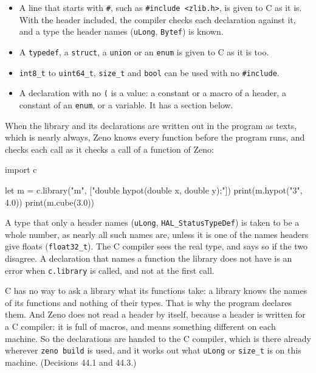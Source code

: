\begin{itemize}
\item A line that starts with \verb|#|, such as
  \verb|#include <zlib.h>|, is given to C as it is. With the header
  included, the compiler checks each declaration against it, and a
  type the header names (\verb|uLong|, \verb|Bytef|) is known.
\item A \verb|typedef|, a \verb|struct|, a \verb|union| or an
  \verb|enum| is given to C as it is too.
\item \verb|int8_t| to \verb|uint64_t|, \verb|size_t| and \verb|bool|
  can be used with no \verb|#include|.
\item A declaration with no \verb|(| is a value: a constant or a macro
  of a header, a constant of an \verb|enum|, or a variable. It has a
  section below.
\end{itemize}

When the library and its declarations are written out in the program
as texts, which is nearly always, Zeno knows every function before the
program runs, and checks each call as it checks a call of a function
of Zeno:

\begin{zeno}[file=wrong.zeno, dir=maths, cmd=zeno check {file}, fails=yes]
import c

let m = c.library("m", ["double hypot(double x, double y);"])
print(m.hypot("3", 4.0))
print(m.cube(3.0))
\end{zeno}

A type that only a header names (\verb|uLong|,
\texttt{HAL\_Status\-TypeDef}) is taken to be a whole number, as nearly
all such names are, unless it is one of the names headers give floats
(\verb|float32_t|). The C compiler sees the real type, and says so if
the two disagree. A declaration that names a function the library does
not have is an error when \verb|c.library| is called, and not at the
first call.

\begin{why}
C has no way to ask a library what its functions take: a library
knows the names of its functions and nothing of their types. That is
why the program declares them. And Zeno does not read a header by
itself, because a header is written for a C compiler: it is full of
macros, and means something different on each machine. So the
declarations are handed to the C compiler, which is there already
wherever \verb|zeno build| is used, and it works out what
\verb|uLong| or \verb|size_t| is on this machine. (Decisions 44.1 and
44.3.)
\end{why}

